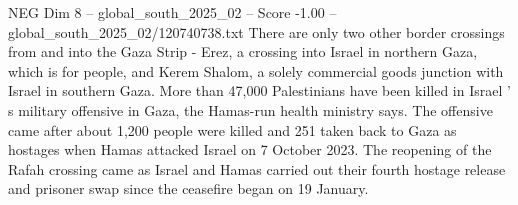 \begin{textsample}{NEG Dim 8 – global\_south\_2025\_02 – Score -1.00 – global\_south\_2025\_02/120740738.txt}
There are only two other border crossings from and into the Gaza Strip - Erez, a crossing into Israel in northern Gaza, which is for people, and Kerem Shalom, a solely commercial goods junction with Israel in southern Gaza.
More than 47,000 Palestinians have been killed in Israel ' s military offensive in Gaza, the Hamas-run health ministry says.
The offensive came after about 1,200 people were killed and 251 taken back to Gaza as hostages when Hamas attacked Israel on 7 October 2023.
The reopening of the Rafah crossing came as Israel and Hamas carried out their fourth hostage release and prisoner swap since the ceasefire began on 19 January.

\end{textsample}

